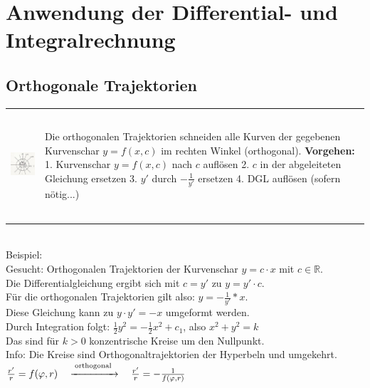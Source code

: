\section{Anwendung der Differential- und Integralrechnung}

\subsection{Orthogonale Trajektorien}
\begin{tabular}{ll}
\parbox{4.5cm}{
\includegraphics[height=4cm]{./bilder/orthoTrajekt.png}
}
& 
\parbox{14.5cm}{
Die orthogonalen Trajektorien schneiden alle Kurven der gegebenen Kurvenschar
$y=f(x,c)$ im rechten Winkel (orthogonal).\\
\textbf{Vorgehen:} \\
1. Kurvenschar $y=f(x,c)$ nach $c$ auflösen\\
2. $c$ in der abgeleiteten Gleichung ersetzen\\
3. $y'$ durch $-\frac{1}{y'}$ ersetzen\\
4. DGL auflösen (sofern nötig...)
}
\end{tabular}
\newline
\vspace{0.50cm}\\
Beispiel:\\
Gesucht: Orthogonalen Trajektorien der Kurvenschar $y=c \cdot x$ mit $c \in \mathbb{R}.$\\
Die Differentialgleichung ergibt sich mit $c=y'$ zu $y=y' \cdot c.$\\
Für die orthogonalen Trajektorien gilt also: $y=-\frac{1}{y'}*x.$\\
Diese Gleichung kann zu $y \cdot y'=-x$ umgeformt werden.\\
Durch Integration folgt: $\frac{1}{2} y^{2}=-\frac{1}{2} x^{2}+c_{1}$, also $x^{2}+y^{2}=k$\\
Das sind für $k>0$ konzentrische Kreise um den Nullpunkt.\\
\newline
Info: Die Kreise sind Orthogonaltrajektorien der Hyperbeln und umgekehrt.\\
$\frac{r^{\prime}}{r}=f(\varphi, r) \quad \stackrel{\text {orthogonal }}{\xrightarrow{\hspace{1.5cm}}} \quad \frac{r^{\prime}}{r}=-\frac{1}{f(\varphi, r)}$\\